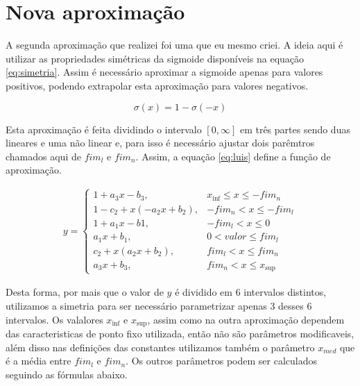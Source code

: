 \documentclass{article}
\begin{document}
\section{Nova aproximação}

A segunda aproximação que realizei foi uma que eu mesmo criei. A ideia aqui é utilizar as propriedades simétricas da sigmoide disponíveis na equação \ref{eq:simetria}. Assim é necessário aproximar a sigmoide apenas para valores positivos, podendo extrapolar esta aproximação para valores negativos.

\begin{equation}
    \label{eq:simetria}
    \sigma(x) = 1 - \sigma(-x)
\end{equation}

Esta aproximação é feita dividindo o intervalo $[0, \infty]$ em três partes sendo duas lineares e uma não linear e, para isso é necessário ajustar dois parêmtros chamados aqui de $fim_l$ e $fim_n$. Assim, a equação \ref{eq:luis} define a função de aproximação.

\begin{equation}
    \label{eq:luis}
    \begin{split}
        y = 
        \begin{cases}
            1 + a_3  x - b_3, & x_{\inf} \leq x \leq -fim_n \\
            1 - c_2 + x  (-a_2  x + b_2), & -fim_n < x \leq -fim_l \\
            1 + a_1  x - b1, & -fim_l < x \leq 0 \\
            a_1  x + b_1, & 0 < valor \leq fim_l \\
            c_2 + x  (a_2  x + b_2), & fim_l < x \leq fim_n \\
            a_3  x + b_3, & fim_n < x \leq x_{\sup}
        \end{cases}
    \end{split}
\end{equation}

Desta forma, por mais que o valor de $y$ é dividido em 6 intervalos distintos, utilizamos a simetria para ser necessário parametrizar apenas 3 desses 6 intervalos. Os valalores $x_{\inf}$ e $x_{\sup}$, assim como na outra aproximação dependem das caracteristicas de ponto fixo utilizada, então não são parâmetros modificaveis, além disso nas definições das constantes utilizamos também o parâmetro $x_{med}$ que é a média entre $fim_l$ e $fim_n$. Os outros parâmetros podem ser calculados seguindo as fórmulas abaixo.
\end{document}
